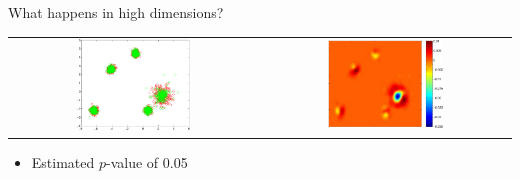 \begin{frame}{What happens in high dimensions?}
  \begin{center}
  \begin{tabular}{cc}
    \includegraphics[width=0.48\textwidth]{figures/high_mog_pca} &
    \pause
    \includegraphics[width=0.48\textwidth]{figures/high_mog_witness}
  \end{tabular}
  \end{center}
  \pause
  \begin{itemize}
    \item Estimated $p$-value of 0.05
  \end{itemize}
\end{frame}

